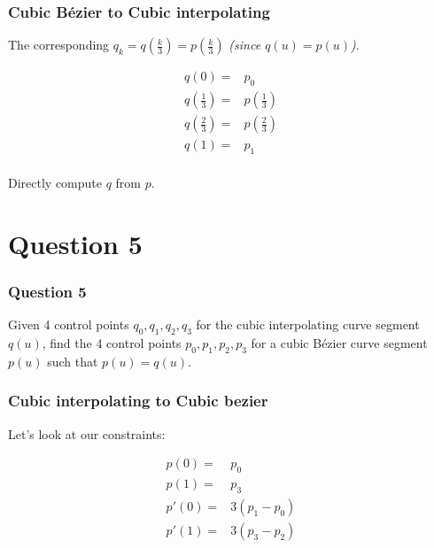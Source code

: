 \documentclass{beamer}
\begin{document}
\begin{frame}
    \frametitle{Cubic Bézier to Cubic interpolating}

    The corresponding $q_k = q(\frac{k}{3}) = p(\frac{k}{3})$ \textit{(since $q(u) = p(u)$)}.
     
    \begin{eqnarray*}
        q(0) =& p_0\\
        q(\frac{1}{3}) =& p(\frac{1}{3})\\
        q(\frac{2}{3}) =& p(\frac{2}{3})\\
        q(1) =& p_1\\
    \end{eqnarray*}

    Directly compute $q$ from $p$.

\end{frame}

\section{Question 5}

\begin{frame}
    \frametitle{Question 5}
    Given 4 control points $q_0, q_1, q_2, q_3$ for the cubic interpolating curve segment $q(u)$,
    find the 4 control points $p_0, p_1, p_2, p_3$ for a cubic Bézier curve segment $p(u)$
    such that $p(u) = q(u)$.
\end{frame}

\begin{frame}
    \frametitle{Cubic interpolating to Cubic bezier}

    Let's look at our constraints:

    \begin{eqnarray*}
        p(0) =& p_0\\
        p(1) =& p_3\\
        p'(0) =& 3(p_1 - p_0)\\
        p'(1) =& 3(p_3 - p_2)
    \end{eqnarray*}

\end{frame}
\end{document}
